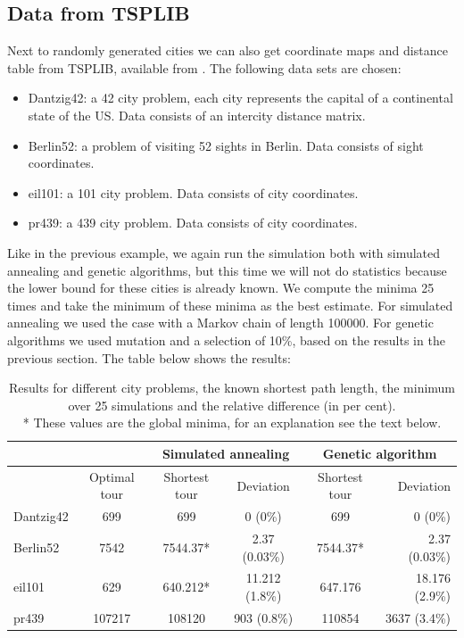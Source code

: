 \documentclass[10pt,a4paper]{article}
\begin{document}
\subsection{Data from TSPLIB}
Next to randomly generated cities we can also get coordinate maps and distance table from TSPLIB, available from \cite{TSPLIB}. The following data sets are chosen:
\begin{itemize}
\item 
  Dantzig42: a 42 city problem, each city represents the capital of a continental state of the US. Data consists of an intercity distance matrix.
\item
  Berlin52: a problem of visiting 52 sights in Berlin. Data consists of sight coordinates.
\item
  eil101: a 101 city problem. Data consists of city coordinates.
\item
  pr439: a 439 city problem. Data consists of city coordinates.
\end{itemize}

Like in the previous example, we again run the simulation both with simulated annealing and genetic algorithms, but this time we will not do statistics because the lower bound for these cities is already known. We compute the minima 25 times and take the minimum of these minima as the best estimate. For simulated annealing we used the case with a Markov chain of length 100000. For genetic algorithms we used mutation and a selection of 10\%, based on the results in the previous section. The table below shows the results:

\begin{table}[H]
  \centering
  \begin{tabular}{ l | *{4}{c} r}
    \multicolumn{2}{l}{} & \multicolumn{2}{c}{Simulated annealing} & \multicolumn{2}{c}{Genetic algorithm} \\
   \hline
   & Optimal tour & Shortest tour & Deviation & Shortest tour & Deviation \\
   \hline
    Dantzig42 & 699 & 699 & 0 (0\%) & 699 & 0 (0\%) \\
    Berlin52 & 7542 & 7544.37* & 2.37 (0.03\%) & 7544.37* & 2.37 (0.03\%) \\
    eil101 & 629 & 640.212* & 11.212 (1.8\%) & 647.176 & 18.176 (2.9\%) \\
    pr439 & 107217 & 108120 & 903 (0.8\%) & 110854 & 3637 (3.4\%)\\
    \hline    
  \end{tabular}
  \caption{Results for different city problems, the known shortest path length, the minimum over 25 simulations and the relative difference (in per cent).\\
* These values are the global minima, for an explanation see the text below.}
  \label{tab:sim_map}
\end{table}
\end{document}
